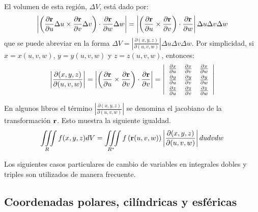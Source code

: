 El volumen de esta región, $\Delta V$, está dado por:
\begin{equation}
\left\vert \left( \frac{\partial {\bf r}}{\partial u}\Delta u\times
\frac{\partial {\bf r}}{\partial v}\Delta v\right) \cdot \frac{\partial {\bf r}}{\partial w}\Delta w\right\vert =\left\vert \left( \frac{\partial {\bf r}}{\partial u}\times \frac{\partial {\bf r}}{\partial v}\right) \cdot \frac{\partial {\bf r}}{\partial w}\right\vert \Delta u\Delta v\Delta w
\end{equation}
que se puede abreviar en la forma
$\Delta V=\left\vert \frac{\partial (x,y,z) }{\partial \left(
u,v,w\right) }\right\vert \Delta u\Delta v\Delta w$.
Por simplicidad, si $x=x(u,v,w) $, $y=y(u,v,w) $ y $z=z(u,v,w)$, entonces:
\begin{equation}
\left\vert \frac{\partial (x,y,z) }{\partial(u,v,w)}\right\vert =\left\vert\left(\frac{\partial{\bf r}}{\partial u}\times \frac{\partial{\bf r}}{\partial v}\right) \cdot \frac{\partial{\bf r}}{\partial v}\right\vert =
\left\vert
\begin{array}{ccc}\frac{\partial x}{\partial u}&\frac{\partial x}{\partial v}&\frac{\partial x}{\partial w}\\[.1cm]
\frac{\partial y}{\partial u}&\frac{\partial y}{\partial v}&\frac{\partial y}{\partial w} \\[0.1cm]
\frac{\partial z}{\partial u}&\frac{\partial z}{\partial v}&\frac{\partial z}{\partial w}
\end{array}\right\vert
\end{equation}

En algunos libros el término $\left\vert \frac{\partial\left(x,y,z\right)}{\partial(u,v,w)}\right\vert$
se denomina el jacobiano de la transformación ${\bf r}$. 
Esto muestra la siguiente igualdad.
\begin{equation}
\iiint\limits_{R}f(x,y,z) dV=\iiint\limits_{R^{\ast}}f\left({\bf r}(u,v,w) \right)\left\vert\frac{\partial (x,y,z)}{\partial (u,v,w) }\right\vert dudvdw
\end{equation}

Los siguientes casos particulares de cambio de variables en integrales dobles y triples son utilizados
de manera frecuente.

\subsection{Coordenadas polares, cilíndricas y esféricas} \label{esfericas}
  

